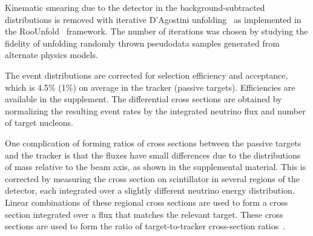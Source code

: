 \documentclass[aps,preprint,showpacs,superscriptaddress,letterpaper,showkeys,superscriptaddress,nofootinbib,floatfix]{revtex4-1}
\newcommand{\firstReviewAdd}[1]{{\bf\color{blue} \protect #1}}
\newcommand{\firstReviewStrike}[1]{{\bf\color{blue}\protect \sout{#1}}}
\newcommand{\firstReviewComment}[1]{{\noindent \bf\color{blue} \small [DAH: #1]}}
\newcommand{\firstRefereeStrike}[1]{{\bf\color{green}\protect \sout{#1}}}
\newcommand{\paperComment}[1]{{\noindent \bf\color{red}\small [Committee: #1]}}
\newcommand{\inProgress}[1]{{\noindent \bf\color{red}\small [Work to complete: #1]}}
\renewcommand{\paperComment}[1]{}
\renewcommand{\firstReviewComment}[1]{}
\renewcommand{\firstReviewAdd}[1]{\protect #1}
\renewcommand{\firstReviewStrike}[1]{}
\renewcommand{\inProgress}[1]{}
\renewcommand{\firstRefereeStrike}[1]{}
\newcommand{\supp}{the supplemental material}
\begin{document}
Kinematic smearing due to the detector in the background-subtracted distributions \firstReviewStrike{are} \firstReviewAdd{is} removed with iterative D'Agostini unfolding~\cite{D'Agostini:1994zf,DAgostini:2010xxxxx} as implemented in the RooUnfold~\cite{Adye:2011gm} framework. The number of iterations was chosen by studying the fidelity of unfolding randomly thrown pseudodata samples generated from alternate physics models. 
\firstReviewStrike{Corrections for detector acceptance or selection efficiencies are applied to each distribution, which are $\sim4.5\%$ for events on scintillator and $\sim1\%$ for events on passive materials.} 
\firstReviewAdd{The event distributions are corrected for selection efficiency and acceptance, which is 4.5\% (1\%) on average in the tracker (passive targets).  Efficiencies are available in the supplement.  }
The differential cross sections are obtained by normalizing the resulting event rates by the integrated neutrino flux and \firstRefereeStrike{the} number of target nucleons.  

One complication of forming ratios of cross sections between the passive targets and the tracker is that the fluxes have small differences due to the distributions of mass relative to the beam axis, as shown in \firstReviewAdd{\supp}\firstReviewStrike{Fig.~\ref{fig:fluxRatios}}.  This is corrected by measuring the \firstReviewStrike{plastic} cross section \firstReviewAdd{on scintillator} in several regions of the detector, each integrated over a slightly different neutrino energy distribution.  Linear combinations of these regional cross sections are used to form a cross section integrated over a flux\firstReviewStrike{identical to that of} \firstReviewAdd{ that matches \firstRefereeStrike{the one seen by}} the relevant target.  These cross sections are used to form the ratio of target-to-tracker cross-section ratios~\cite{BercellieThesis,KleykampThesis}.

\end{document}
